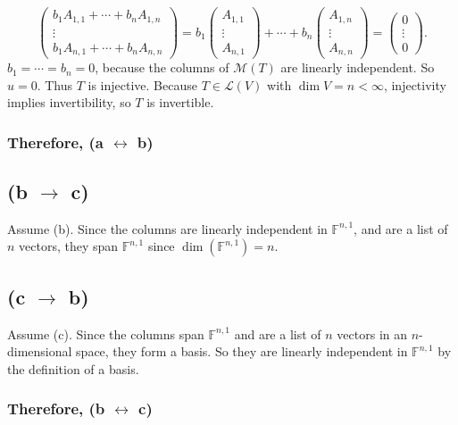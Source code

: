 \documentclass[11pt]{article}
\begin{document}
\begin{solutionBox}
\[
\begin{pmatrix}b_1A_{1,1}+\cdots+b_nA_{1,n}\\ \vdots\\ b_1A_{n,1}+\cdots+b_nA_{n,n}\end{pmatrix}
=
b_1\begin{pmatrix}A_{1,1}\\ \vdots\\ A_{n,1}\end{pmatrix}
+\cdots+
b_n\begin{pmatrix}A_{1,n}\\ \vdots\\ A_{n,n}\end{pmatrix}
=
\begin{pmatrix}0\\ \vdots\\ 0\end{pmatrix}.
\]
$b_1=\cdots=b_n=0$, because the columns of $\mathcal{M}(T)$ are linearly independent. So $u=0$.
Thus $T$ is injective. Because $T\in\mathcal{L}(V)$ with $\dim V=n<\infty$, injectivity implies invertibility, so $T$ is invertible.

\subsubsection*{Therefore, (a $\leftrightarrow$ b)}

\subsection*{(b $\to$ c)}
Assume (b). Since the columns are linearly independent in $\mathbb{F}^{n,1}$, and are a list of $n$ vectors, they span $\mathbb{F}^{n,1}$ since $\dim(\mathbb{F}^{n,1})=n$.

\subsection*{(c $\to$ b)}
Assume (c). Since the columns span $\mathbb{F}^{n,1}$ and are a list of $n$ vectors in an $n$-dimensional space, they form a basis. So they are linearly independent in $\mathbb{F}^{n,1}$ by the definition of a basis.

\subsubsection*{Therefore, (b $\leftrightarrow$ c)}


\end{solutionBox}
\end{document}
